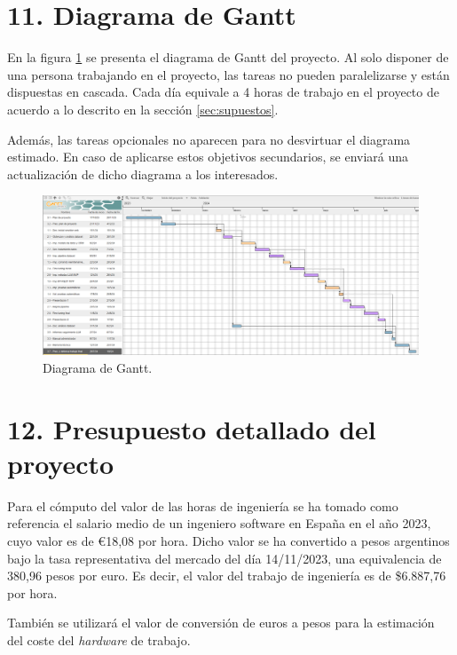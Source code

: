 \documentclass[
11pt, %
]{Clases/charter}
\begin{document}
\section{11. Diagrama de Gantt}
En la figura \ref{fig:diagGantt} se presenta el diagrama de Gantt del proyecto.
Al solo disponer de una persona trabajando en el proyecto, las tareas no pueden paralelizarse y están dispuestas en cascada.
Cada día equivale a 4 horas de trabajo en el proyecto de acuerdo a lo descrito en la sección \ref{sec:supuestos}.

Además, las tareas opcionales no aparecen para no desvirtuar el diagrama estimado.
En caso de aplicarse estos objetivos secundarios, se enviará una actualización de dicho diagrama a los interesados.

\label{sec:gantt}
\begin{landscape}
	\begin{figure}[htpb]
		\centering
		\includegraphics[height=.67\textheight]{./Figuras/Gantt-2.png}
		\caption{Diagrama de Gantt.}
		\label{fig:diagGantt}
	\end{figure}
\end{landscape}
\section{12. Presupuesto detallado del proyecto}
\label{sec:presupuesto}
Para el cómputo del valor de las horas de ingeniería se ha tomado como referencia el salario medio de un ingeniero software en España en el año 2023, cuyo valor es de \euro18,08 por hora.
Dicho valor se ha convertido a pesos argentinos bajo la tasa representativa del mercado del día 14/11/2023, una equivalencia de 380,96 pesos por euro.
Es decir, el valor del trabajo de ingeniería es de \$6.887,76 por hora.

También se utilizará el valor de conversión de euros a pesos para la estimación del coste del \textit{hardware} de trabajo.
\end{document}
